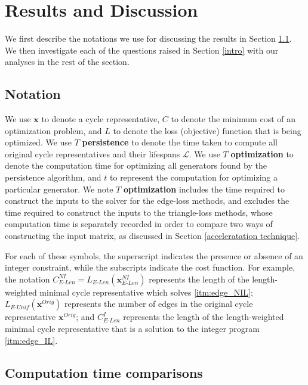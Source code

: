 \documentclass[utf8]{formatting_stuff/frontiersFPHY}
\newcommand{\originalrep}{\mathbf{x}^{Orig}}
\newcommand{\optimalrep}{\mathbf{x}}
\newcommand{\se}{Section }
\newcommand{\NI}{^{NI}}
\newcommand{\I}{^I}
\newcommand{\persinterval}{\mathcal{L}}
\newcommand{\EU}{_{E\text{-}Unif}}
\newcommand{\EL}{_{E\text{-}Len}}
\theoremstyle{plain}
\theoremstyle{definition}
\begin{document}
 
\section{Results and Discussion}\label{results}

We first describe the notations we use for discussing the results in \se \ref{notations}. We then investigate each of the questions raised in \se \ref{intro} with our analyses in the rest of the section.

\subsection{Notation}\label{notations}

We use $\optimalrep$ to denote a cycle representative, $C$ to denote the minimum cost of an optimization problem, and $L$ to denote the loss (objective) function that is being optimized. 
We use $T$ \textbf{persistence} to denote the time taken to compute all original cycle representatives and their lifespans $\persinterval$. We use $T$ \textbf{optimization} to denote the computation time for optimizing all generators found by the persistence algorithm, and $t$ to represent the computation for optimizing a particular generator. We note $T$ \textbf{optimization} includes the time required to construct the inputs to the solver for the edge-loss methods, and excludes the time required to construct the inputs to the triangle-loss methods, whose computation time is separately recorded in order to compare two ways of constructing the input matrix, as discussed in \se \ref{acceleratation technique}. 


For each of these symbols, the superscript indicates the presence or absence of an integer constraint, while the subscripts indicate the cost function.  
For example, the notation $C\EL\NI = L\EL(\optimalrep\EL\NI)$ represents the length of the length-weighted minimal cycle representative which solves \ref{itm:edge_NIL}; $L\EU(\originalrep)$ represents the number of edges in the original cycle representative $\originalrep$; and $C\EL\I$ represents the length of the length-weighted minimal cycle representative that is a solution to the integer program \ref{itm:edge_IL}. 



\subsection{Computation time comparisons} 
\label{sec:timecomparisons}
\end{document}
